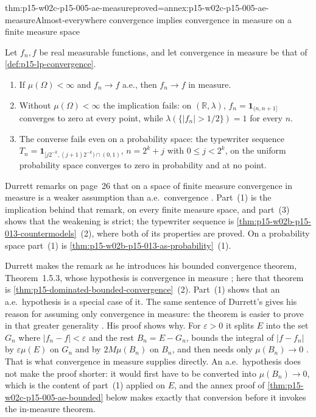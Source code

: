 \begin{hbtheorem}{thm:p15-w02c-p15-005-ae-measure}{proved=annex:p15-w02c-p15-005-ae-measure}{Almost-everywhere convergence implies convergence in measure on a finite measure space}
\par\nobreak
Let \(f_n,f\) be real measurable functions, and let convergence in
measure be that of \cref{def:p15-lp-convergence}.
\begin{enumerate}
\item If \(\mu(\Omega)<\infty\) and \(f_n\to f\) a.e., then
      \(f_n\to f\) in measure.
\item Without \(\mu(\Omega)<\infty\) the implication fails: on
      \((\mathbb R,\lambda)\), \(f_n=\mathbf1_{(n,n+1]}\) converges
      to zero at every point, while
      \(\lambda(\{|f_n|>1/2\})=1\) for every \(n\).
\item The converse fails even on a probability space: the typewriter
      sequence \(T_n=\mathbf1_{[j2^{-k},(j+1)2^{-k})\cap(0,1)}\),
      \(n=2^k+j\) with \(0\leq j<2^k\), on the uniform probability
      space converges to zero in probability and at no point.
\end{enumerate}
\end{hbtheorem}

Durrett remarks on page~26 that on a space of finite measure
convergence in measure is a weaker assumption than a.e.\ convergence
\cite[p.~26]{DurrettPTEAuthor2019}. Part~(1) is the implication behind
that remark, on every finite measure space, and part~(3) shows that the
weakening is strict; the typewriter sequence is
\cref{thm:p15-w02b-p15-013-countermodels}~(2), where both of its
properties are proved. On a probability space part~(1) is
\cref{thm:p15-w02b-p15-013-as-probability}~(1).

Durrett makes the remark as he introduces his bounded convergence
theorem, Theorem~1.5.3, whose hypothesis is convergence in measure
\cite[p.~26]{DurrettPTEAuthor2019}; here that theorem is
\cref{thm:p15-dominated-bounded-convergence}~(2). Part~(1) shows that
an a.e.\ hypothesis is a special case of it. The same sentence of
Durrett's gives his reason for assuming only convergence in measure:
the theorem is easier to prove in that greater generality
\cite[p.~26]{DurrettPTEAuthor2019}. His proof shows why. For
\(\varepsilon>0\) it splits \(E\) into the set \(G_n\) where
\(|f_n-f|<\varepsilon\) and the rest \(B_n=E-G_n\), bounds the
integral of \(|f-f_n|\) by \(\varepsilon\mu(E)\) on \(G_n\) and by
\(2M\mu(B_n)\) on \(B_n\), and then needs only \(\mu(B_n)\to0\)
\cite[thm.~1.5.3, p.~26]{DurrettPTEAuthor2019}. That is what
convergence in measure supplies directly. An a.e.\ hypothesis does not
make the proof shorter: it would first have to be converted into
\(\mu(B_n)\to0\), which is the content of part~(1) applied on \(E\),
and the annex proof of \cref{thm:p15-w02c-p15-005-ae-bounded} below
makes exactly that conversion before it invokes the in-measure
theorem.

